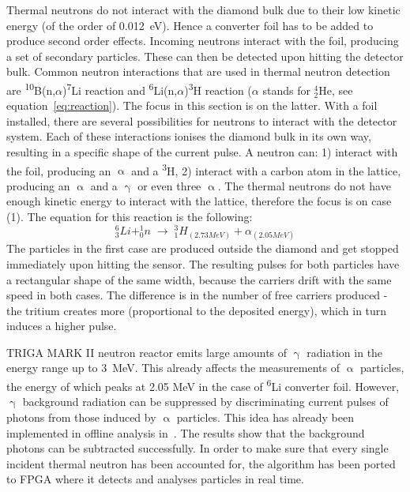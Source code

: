Thermal neutrons do not interact with the diamond bulk due to their low kinetic energy (of the order of 0.012~eV). Hence a converter foil has to be added to produce second order effects. Incoming neutrons interact with the foil, producing a set of secondary particles. These can then be detected upon hitting the detector bulk. Common neutron interactions that are used in thermal neutron detection are \textsuperscript{10}B(n,$\alpha$)\textsuperscript{7}Li reaction and \textsuperscript{6}Li(n,$\alpha$)\textsuperscript{3}H reaction ($\alpha$ stands for $^4_2$He, see equation~\ref{eq:reaction}). The focus in this section is on the latter. With a foil installed, there are several possibilities for neutrons to interact with the detector system. Each of these interactions ionises the diamond bulk in its own way, resulting in a specific shape of the current pulse. A neutron can: 1) interact with the foil, producing an $\upalpha$ and a \textsuperscript{3}H, 2) interact with a carbon atom in the lattice, producing an $\upalpha$ and a $\upgamma$ or even three $\upalpha$. The thermal neutrons do not have enough kinetic energy to interact with the lattice, therefore the focus is on case (1). The equation for this reaction is the following:
\begin{equation}
\label{eq:reaction}
   ^6_3Li   +   ^1_0n \;\rightarrow\; ^3_1H_{(2.73 MeV)} + \alpha_{(2.05 MeV)}
\end{equation}
The particles in the first case are produced outside the diamond and get stopped immediately upon hitting the sensor. The resulting pulses for both particles have a rectangular shape of the same width, because the carriers drift with the same speed in both cases. The difference is in the number of free carriers produced - the tritium creates more (proportional to the deposited energy), which in turn induces a higher pulse.

TRIGA MARK II neutron reactor emits large amounts of $\upgamma$ radiation in the energy range up to 3~MeV. This already affects the measurements of $\upalpha$ particles, the energy of which peaks at 2.05 MeV in the case of \textsuperscript{6}Li converter foil. However, $\upgamma$ background radiation can be suppressed by discriminating current pulses of photons from those induced by $\upalpha$ particles. This idea has already been implemented in offline analysis in~\cite{PAVEL:00000,PAVEL:00002}. The results show that the background photons can be subtracted successfully. In order to make sure that every single incident thermal neutron has been accounted for, the algorithm has been ported to FPGA where it detects and analyses particles in real time. 

